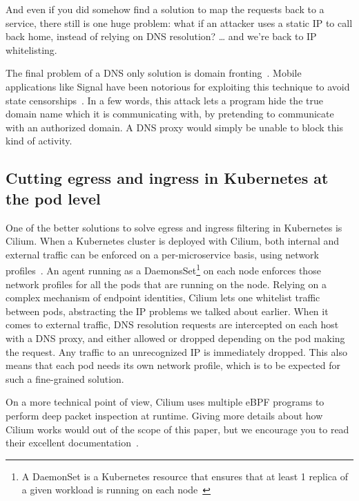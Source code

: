 And even if you did somehow find a solution to map the requests back to a service, there still is one huge problem: what if an attacker uses a static IP to call back home, instead of relying on DNS resolution? … and we’re back to IP whitelisting.

The final problem of a DNS only solution is domain fronting~\cite{ProcessLevelNetworkSecurityMonitoring:DavidFifieldChangLanRodHynesPercyWegmannVernPaxson}. Mobile applications like Signal have been notorious for exploiting this technique to avoid state censorships~\cite{ProcessLevelNetworkSecurityMonitoring:Signal}. In a few words, this attack lets a program hide the true domain name which it is communicating with, by pretending to communicate with an authorized domain. A DNS proxy would simply be unable to block this kind of activity.


\subsection{Cutting egress and ingress in Kubernetes at the pod level}

One of the better solutions to solve egress and ingress filtering in Kubernetes is Cilium. When a Kubernetes cluster is deployed with Cilium, both internal and external traffic can be enforced on a per-microservice basis, using network profiles~\cite{ProcessLevelNetworkSecurityMonitoring:Cilium}. An agent running as a DaemonsSet\footnote{A DaemonSet is a Kubernetes resource that ensures that at least 1 replica of a given workload is running on each node~\cite{ProcessLevelNetworkSecurityMonitoring:JohnArundelJustinDomingus}} on each node enforces those network profiles for all the pods that are running on the node. Relying on a complex mechanism of endpoint identities, Cilium lets one whitelist traffic between pods, abstracting the IP problems we talked about earlier. When it comes to external traffic, DNS resolution requests are intercepted on each host with a DNS proxy, and either allowed or dropped depending on the pod making the request. Any traffic to an unrecognized IP is immediately dropped. This also means that each pod needs its own network profile, which is to be expected for such a fine-grained solution.

On a more technical point of view, Cilium uses multiple eBPF programs to perform deep packet inspection at runtime. Giving more details about how Cilium works would out of the scope of this paper, but we encourage you to read their excellent documentation~\cite{ProcessLevelNetworkSecurityMonitoring:Cilium}.

